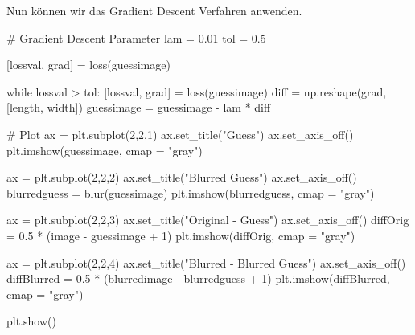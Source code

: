 \documentclass[
  a4paper,
  DIV=11]{scrreprt}
\newenvironment{Shaded}{\begin{snugshade}}{\end{snugshade}}
\newcommand{\CommentTok}[1]{\textcolor[rgb]{0.37,0.37,0.37}{#1}}
\newcommand{\ControlFlowTok}[1]{\textcolor[rgb]{0.00,0.23,0.31}{#1}}
\newcommand{\DecValTok}[1]{\textcolor[rgb]{0.68,0.00,0.00}{#1}}
\newcommand{\FloatTok}[1]{\textcolor[rgb]{0.68,0.00,0.00}{#1}}
\newcommand{\NormalTok}[1]{\textcolor[rgb]{0.00,0.23,0.31}{#1}}
\newcommand{\OperatorTok}[1]{\textcolor[rgb]{0.37,0.37,0.37}{#1}}
\newcommand{\StringTok}[1]{\textcolor[rgb]{0.13,0.47,0.30}{#1}}
\theoremstyle{definition}
\theoremstyle{definition}
\theoremstyle{remark}
\begin{document}
Nun können wir das Gradient Descent Verfahren anwenden.

\begin{Shaded}
\begin{Highlighting}[]
\CommentTok{\# Gradient Descent Parameter}
\NormalTok{lam }\OperatorTok{=} \FloatTok{0.01}
\NormalTok{tol }\OperatorTok{=} \FloatTok{0.5}

\NormalTok{[lossval, grad] }\OperatorTok{=}\NormalTok{ loss(guessimage)}

\ControlFlowTok{while}\NormalTok{ lossval }\OperatorTok{\textgreater{}}\NormalTok{ tol:}
\NormalTok{    [lossval, grad] }\OperatorTok{=}\NormalTok{ loss(guessimage) }
\NormalTok{    diff }\OperatorTok{=}\NormalTok{ np.reshape(grad, [length, width])}
\NormalTok{    guessimage }\OperatorTok{=}\NormalTok{ guessimage }\OperatorTok{{-}}\NormalTok{ lam }\OperatorTok{*}\NormalTok{ diff}

\CommentTok{\# Plot}
\NormalTok{ax }\OperatorTok{=}\NormalTok{ plt.subplot(}\DecValTok{2}\NormalTok{,}\DecValTok{2}\NormalTok{,}\DecValTok{1}\NormalTok{)}
\NormalTok{ax.set\_title(}\StringTok{"Guess"}\NormalTok{)}
\NormalTok{ax.set\_axis\_off()}
\NormalTok{plt.imshow(guessimage, cmap }\OperatorTok{=} \StringTok{"gray"}\NormalTok{)}

\NormalTok{ax }\OperatorTok{=}\NormalTok{ plt.subplot(}\DecValTok{2}\NormalTok{,}\DecValTok{2}\NormalTok{,}\DecValTok{2}\NormalTok{)}
\NormalTok{ax.set\_title(}\StringTok{"Blurred Guess"}\NormalTok{)}
\NormalTok{ax.set\_axis\_off()}
\NormalTok{blurredguess }\OperatorTok{=}\NormalTok{ blur(guessimage)}
\NormalTok{plt.imshow(blurredguess, cmap }\OperatorTok{=} \StringTok{"gray"}\NormalTok{)}

\NormalTok{ax }\OperatorTok{=}\NormalTok{ plt.subplot(}\DecValTok{2}\NormalTok{,}\DecValTok{2}\NormalTok{,}\DecValTok{3}\NormalTok{)}
\NormalTok{ax.set\_title(}\StringTok{"Original {-} Guess"}\NormalTok{)}
\NormalTok{ax.set\_axis\_off()}
\NormalTok{diffOrig }\OperatorTok{=} \FloatTok{0.5} \OperatorTok{*}\NormalTok{ (image }\OperatorTok{{-}}\NormalTok{ guessimage }\OperatorTok{+} \DecValTok{1}\NormalTok{)}
\NormalTok{plt.imshow(diffOrig, cmap }\OperatorTok{=} \StringTok{"gray"}\NormalTok{)}

\NormalTok{ax }\OperatorTok{=}\NormalTok{ plt.subplot(}\DecValTok{2}\NormalTok{,}\DecValTok{2}\NormalTok{,}\DecValTok{4}\NormalTok{)}
\NormalTok{ax.set\_title(}\StringTok{"Blurred {-} Blurred Guess"}\NormalTok{)}
\NormalTok{ax.set\_axis\_off()}
\NormalTok{diffBlurred }\OperatorTok{=} \FloatTok{0.5} \OperatorTok{*}\NormalTok{ (blurredimage }\OperatorTok{{-}}\NormalTok{ blurredguess }\OperatorTok{+} \DecValTok{1}\NormalTok{)}
\NormalTok{plt.imshow(diffBlurred, cmap }\OperatorTok{=} \StringTok{"gray"}\NormalTok{)}

\NormalTok{plt.show()}
\end{Highlighting}
\end{Shaded}
\end{document}
